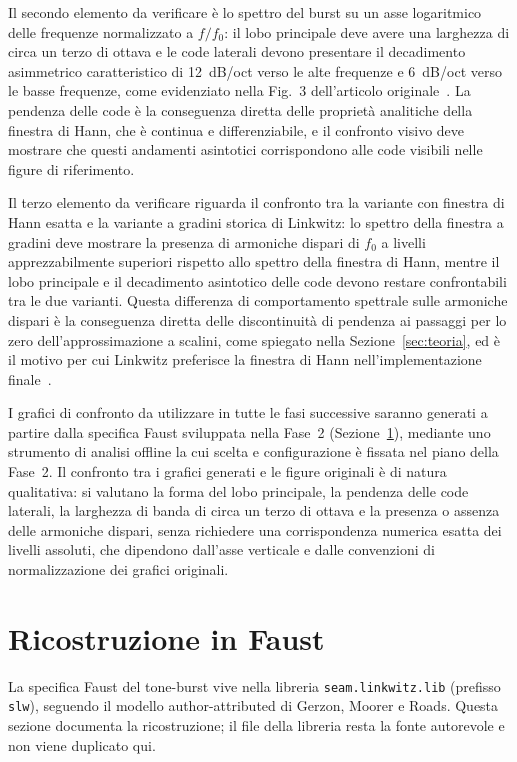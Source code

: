 \documentclass[11pt,a4paper]{article}
\begin{document}
Il secondo elemento da verificare è lo spettro del burst su un asse logaritmico delle frequenze
normalizzato a $f/f_0$: il lobo principale deve avere una larghezza di circa un terzo di ottava e
le code laterali devono presentare il decadimento asimmetrico caratteristico di \SI{12}{dB/oct} verso
le alte frequenze e \SI{6}{dB/oct} verso le basse frequenze, come evidenziato nella Fig.~3
dell'articolo originale~\cite{linkwitz1980shaped}.
La pendenza delle code è la conseguenza diretta delle proprietà analitiche della finestra di Hann,
che è continua e differenziabile, e il confronto visivo deve mostrare che questi andamenti asintotici
corrispondono alle code visibili nelle figure di riferimento.

Il terzo elemento da verificare riguarda il confronto tra la variante con finestra di Hann esatta e
la variante a gradini storica di Linkwitz: lo spettro della finestra a gradini deve mostrare la
presenza di armoniche dispari di $f_0$ a livelli apprezzabilmente superiori rispetto allo spettro
della finestra di Hann, mentre il lobo principale e il decadimento asintotico delle code devono
restare confrontabili tra le due varianti.
Questa differenza di comportamento spettrale sulle armoniche dispari è la conseguenza diretta delle
discontinuità di pendenza ai passaggi per lo zero dell'approssimazione a scalini, come spiegato
nella Sezione~\ref{sec:teoria}, ed è il motivo per cui Linkwitz preferisce la finestra di Hann
nell'implementazione finale~\cite{linkwitz1980shaped}.

I grafici di confronto da utilizzare in tutte le fasi successive saranno generati a partire dalla
specifica Faust sviluppata nella Fase~2 (Sezione~\ref{sec:faust}), mediante uno strumento di analisi
offline la cui scelta e configurazione è fissata nel piano della Fase~2.
Il confronto tra i grafici generati e le figure originali è di natura qualitativa: si valutano la
forma del lobo principale, la pendenza delle code laterali, la larghezza di banda di circa un terzo
di ottava e la presenza o assenza delle armoniche dispari, senza richiedere una corrispondenza
numerica esatta dei livelli assoluti, che dipendono dall'asse verticale e dalle convenzioni di
normalizzazione dei grafici originali.

\section{Ricostruzione in Faust}\label{sec:faust}
La specifica Faust del tone-burst vive nella libreria \texttt{seam.linkwitz.lib} (prefisso \texttt{slw}), seguendo il modello author-attributed di Gerzon, Moorer e Roads.
Questa sezione documenta la ricostruzione; il file della libreria resta la fonte autorevole e non viene duplicato qui.
\end{document}
